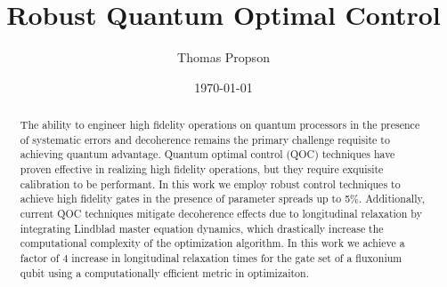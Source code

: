 \documentclass[
  amsfonts,
  amsmath,
  tbtags,
  amssymb,
  aps,
  nobibnotes,
  twocolumn,
]{revtex4-2}
\begin{document}
\title{Robust Quantum Optimal Control}

\author{Thomas Propson}

\date{\today}


\begin{abstract}
  The ability to engineer high fidelity operations on quantum processors in the presence of
  systematic errors and decoherence remains the primary challenge requisite to achieving quantum advantage.
  Quantum optimal control (QOC) techniques have proven effective in realizing high fidelity operations,
  but they require exquisite calibration to be performant. In this work we employ robust control techniques
  to achieve high fidelity gates in the presence of parameter spreads up to 5$\%$.
  Additionally, current QOC techniques mitigate decoherence effects due to longitudinal relaxation by integrating
  Lindblad master equation dynamics, which drastically increase the computational complexity
  of the optimization algorithm.
  In this work we achieve a factor of $4$ increase in longitudinal relaxation times
  for the gate set of a fluxonium qubit
  using a computationally efficient metric in optimizaiton.
  
\end{abstract}

\maketitle
\end{document}
